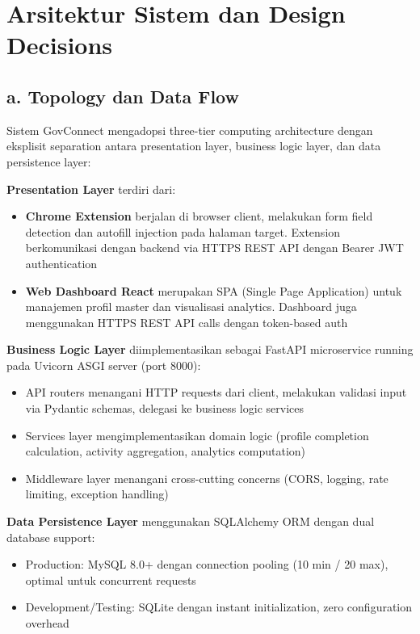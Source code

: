 \documentclass[12pt,a4paper]{article}
\begin{document}
\newpage

\section{Arsitektur Sistem dan Design Decisions}

\subsection*{a. Topology dan Data Flow}

Sistem GovConnect mengadopsi three-tier computing architecture dengan eksplisit separation antara presentation layer, business logic layer, dan data persistence layer:

\textbf{Presentation Layer} terdiri dari:
\begin{itemize}
  \item \textbf{Chrome Extension} berjalan di browser client, melakukan form field detection dan autofill injection pada halaman target. Extension berkomunikasi dengan backend via HTTPS REST API dengan Bearer JWT authentication
  
  \item \textbf{Web Dashboard React} merupakan SPA (Single Page Application) untuk manajemen profil master dan visualisasi analytics. Dashboard juga menggunakan HTTPS REST API calls dengan token-based auth
\end{itemize}

\textbf{Business Logic Layer} diimplementasikan sebagai FastAPI microservice running pada Uvicorn ASGI server (port 8000):
\begin{itemize}
  \item API routers menangani HTTP requests dari client, melakukan validasi input via Pydantic schemas, delegasi ke business logic services
  
  \item Services layer mengimplementasikan domain logic (profile completion calculation, activity aggregation, analytics computation)
  
  \item Middleware layer menangani cross-cutting concerns (CORS, logging, rate limiting, exception handling)
\end{itemize}

\textbf{Data Persistence Layer} menggunakan SQLAlchemy ORM dengan dual database support:
\begin{itemize}
  \item Production: MySQL 8.0+ dengan connection pooling (10 min / 20 max), optimal untuk concurrent requests
  
  \item Development/Testing: SQLite dengan instant initialization, zero configuration overhead
\end{itemize}
\end{document}
